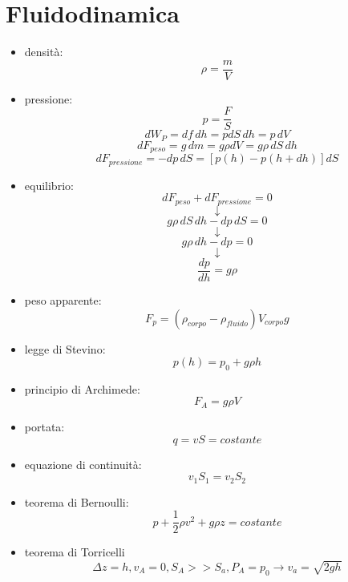 \documentclass[a4paper,12pt, oneside]{book}
\begin{document}
\section{Fluidodinamica}
\begin{itemize}
	\item densità:
	      $$\rho=\frac{m}{V}$$
	\item pressione:
	      $$p=\frac{F}{S}$$
	      $$dW_P=df\,dh=pdS\,dh=p\,dV$$
	      $$dF_{peso}=g\,dm=g\rho dV=g\rho \,dS\,dh$$
	      $$dF_{pressione}=-dp\,dS=[p(h)-p(h+dh)]dS$$
	\item equilibrio:
	      $$dF_{peso}+dF_{pressione}=0$$
	      $$\downarrow$$
	      $$g\rho \,dS\,dh-dp\,dS=0$$
	      $$\downarrow$$
	      $$g\rho \,dh-dp=0$$
	      $$\downarrow$$
	      $$\frac{dp}{dh}=g\rho$$
	\item peso apparente:
	      $$F_p=(\rho_{corpo}-\rho_{fluido})V_{corpo}g$$
	\item legge di Stevino:
	      $$p(h)=p_0+g\rho h$$
	\item principio di Archimede:
	      $$F_A=g\rho V$$
	\item portata:
	      $$q=vS=costante$$
	\item equazione di continuità:
	      $$v_1S_1=v_2S_2$$
	\item teorema di Bernoulli:
	      $$p+\frac{1}{2}\rho v^2+g\rho z =costante$$
	\item teorema di Torricelli
	      $$\Delta z= h, v_A=0, S_A>>S_a, P_A=p_0\to v_a=\sqrt{2gh}$$
\end{itemize}
\end{document}
